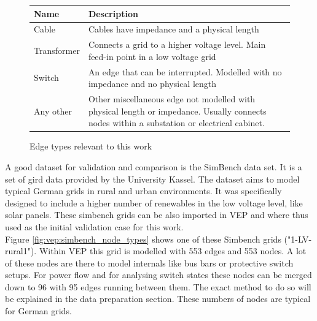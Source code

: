 \begin{figure}[H]
    \begin{tabular}{l p{10cm}}
        Name & Description\\
        \hline
        Cable & Cables have impedance and a physical length\\
        Transformer & Connects a grid to a higher voltage level. Main feed-in point in a low voltage grid\\
        Switch & An edge that can be interrupted. Modelled with no impedance and no physical length\\
        Any other & Other miscellaneous edge not modelled with physical length or impedance. Usually connects nodes within a substation or electrical cabinet.
      \end{tabular}
    \caption{Edge types relevant to this work}
    \label{table:vep:edges}
\end{figure}

A good dataset for validation and comparison is the SimBench data set. It is a set of
gird data provided by the University Kassel. The dataset aims to model typical German
grids in rural and urban environments. It was specifically designed to include a higher
number of renewables in the low voltage level, like solar panels\autocite{simbench}. These
simbench grids can be also imported in VEP and where thus used as the initial validation case
for this work.\\

Figure \ref{fig:vep:simbench_node_types} shows one of these Simbench grids ("1-LV-rural1"). 
Within VEP this grid is modelled with 553 edges and 553 nodes. A lot of these nodes are there to model
internals like bus bars or protective switch setups. For power flow and for analysing
switch states these nodes can be merged down to 96 with 95 edges running between them. 
The exact method to do so will be explained in the data preparation section. These numbers of nodes
are typical for German grids\autocite{venios}.


